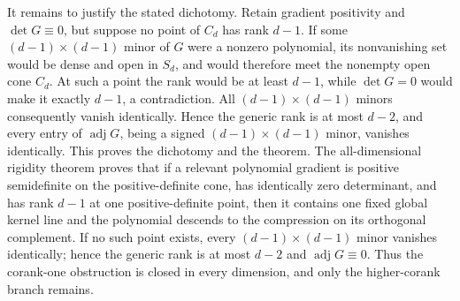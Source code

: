 It remains to justify the stated dichotomy.  Retain gradient positivity and \(\det G\equiv0\), but suppose no point of \(C_d\) has rank \(d-1\).  If some \((d-1)\times(d-1)\) minor of \(G\) were a nonzero polynomial, its nonvanishing set would be dense and open in \(S_d\), and would therefore meet the nonempty open cone \(C_d\).  At such a point the rank would be at least \(d-1\), while \(\det G=0\) would make it exactly \(d-1\), a contradiction.  All \((d-1)\times(d-1)\) minors consequently vanish identically.  Hence the generic rank is at most \(d-2\), and every entry of \(\operatorname{adj}G\), being a signed \((d-1)\times(d-1)\) minor, vanishes identically.  This proves the dichotomy and the theorem.
The all-dimensional rigidity theorem proves that if a relevant polynomial gradient is positive semidefinite on the positive-definite cone, has identically zero determinant, and has rank \(d-1\) at one positive-definite point, then it contains one fixed global kernel line and the polynomial descends to the compression on its orthogonal complement.  If no such point exists, every \((d-1)\times(d-1)\) minor vanishes identically; hence the generic rank is at most \(d-2\) and \(\operatorname{adj}G\equiv0\).  Thus the corank-one obstruction is closed in every dimension, and only the higher-corank branch remains.
